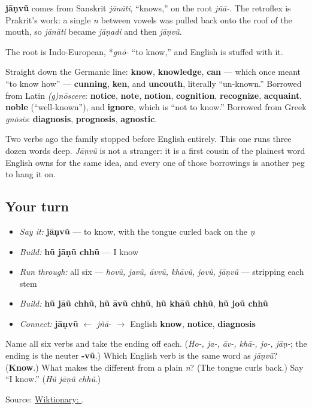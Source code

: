 \begin{cousinweb}
\textbf{jāṇvũ} comes from Sanskrit \emph{jānāti}, \textquotedblleft{}knows,\textquotedblright{} on the root \emph{jñā-}. The retroflex is Prakrit's work: a single \emph{n} between vowels was pulled back onto the roof of the mouth, so \emph{jānāti} became \emph{jāṇadi} and then \emph{jāṇvũ}.

The root is Indo-European, *\emph{gnō-} \textquotedblleft{}to know,\textquotedblright{} and English is stuffed with it.

Straight down the Germanic line: \textbf{know}, \textbf{knowledge}, \textbf{can} — which once meant \textquotedblleft{}to know how\textquotedblright{} — \textbf{cunning}, \textbf{ken}, and \textbf{uncouth}, literally \textquotedblleft{}un-known.\textquotedblright{} Borrowed from Latin \emph{(g)nōscere}: \textbf{notice}, \textbf{note}, \textbf{notion}, \textbf{cognition}, \textbf{recognize}, \textbf{acquaint}, \textbf{noble} (\textquotedblleft{}well-known\textquotedblright{}), and \textbf{ignore}, which is \textquotedblleft{}not to know.\textquotedblright{} Borrowed from Greek \emph{gnōsis}: \textbf{diagnosis}, \textbf{prognosis}, \textbf{agnostic}.

Two verbs ago the family stopped before English entirely. This one runs three dozen words deep. \emph{Jāṇvũ} is not a stranger: it is a first cousin of the plainest word English owns for the same idea, and every one of those borrowings is another peg to hang it on.
\end{cousinweb}

\subsection*{Your turn}
\begin{itemize}
\raggedright
  \item \emph{Say it:} \textbf{jāṇvũ} — to know, with the tongue curled back on the \emph{ṇ}
  \item \emph{Build:} \textbf{hũ jāṇũ chhũ} — I know
  \item \emph{Run through:} all six — \emph{hovũ, javũ, āvvũ, khāvũ, jovũ, jāṇvũ} — stripping each stem
  \item \emph{Build:} \textbf{hũ jāũ chhũ}, \textbf{hũ āvũ chhũ}, \textbf{hũ khāũ chhũ}, \textbf{hũ joũ chhũ}
  \item \emph{Connect:} \textbf{jāṇvũ} $\leftarrow$ \emph{jñā-} $\to$ English \textbf{know}, \textbf{notice}, \textbf{diagnosis}
\end{itemize}

\begin{tcolorbox}[breakable,colback=teal!4,colframe=teal!35!black,title={Before you move on}]
Name all six verbs and take the ending off each. (\emph{Ho-, ja-, āv-, khā-, jo-, jāṇ-}; the ending is the neuter \textbf{-vũ}.) Which English verb is the same word as \emph{jāṇvũ}? (\textbf{Know}.) What makes the \textbf{} different from a plain \emph{n}? (The tongue curls back.) Say \textquotedblleft{}I know.\textquotedblright{} (\emph{Hũ jāṇũ chhũ}.)

Source: \href{https://en.wiktionary.org/wiki/\%E0\%AA\%9C\%E0\%AA\%BE\%E0\%AA\%A3\%E0\%AA\%B5\%E0\%AB\%81\%E0\%AA\%82}{Wiktionary: }.
\end{tcolorbox}
